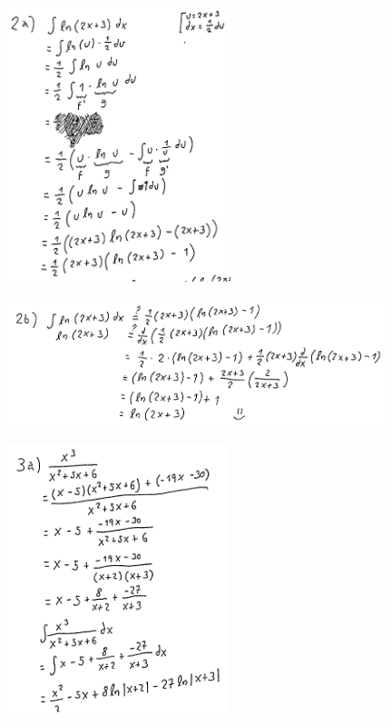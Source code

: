 \documentclass[oneside,12pt]{article}
\begin{document}
\includegraphics[height=8cm]{2020-1-C2/20201201_p1gab_2a.pdf}

\newpage

\includegraphics[width=11cm]{2020-1-C2/20201201_p1gab_2b.pdf}

\newpage

\includegraphics[height=8cm]{2020-1-C2/20201201_p1gab_3a.pdf}
\end{document}
